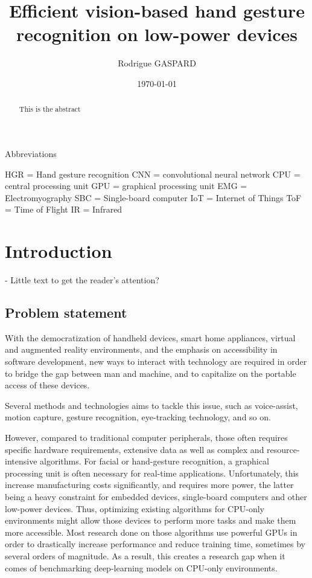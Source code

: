 \documentclass[12pt]{article}
\title{Efficient vision-based hand gesture recognition on low-power devices}
\author{Rodrigue GASPARD}
\date{\today}
\begin{document}
  \maketitle

  Abbreviations

  HGR = Hand gesture recognition
  CNN = convolutional neural network
  CPU = central processing unit
  GPU = graphical processing unit
  EMG = Electromyography
  SBC = Single-board computer
  IoT = Internet of Things
  ToF = Time of Flight
  IR = Infrared

  \begin{abstract}
    This is the abstract
  \end{abstract}

  \section{Introduction}

  - Little text to get the reader's attention?

  \subsection{Problem statement}

  With the democratization of handheld devices, smart home appliances,  virtual and augmented reality environments, and the emphasis on accessibility in software development, new ways to interact with technology are required in order to bridge the gap between man and machine, and to capitalize on the portable access of these devices. 

  Several methods and technologies aims to tackle this issue, such as voice-assist, motion capture, gesture recognition, eye-tracking technology, and so on. 

  However, compared to traditional computer peripherals, those often requires specific hardware requirements, extensive data as well as complex and resource-intensive algorithms. For facial or hand-gesture recognition, a graphical processing unit is often necessary for real-time applications. Unfortunately, this increase manufacturing costs significantly, and requires more power, the latter being a heavy constraint for embedded devices, single-board computers and other low-power devices.
  Thus, optimizing existing algorithms for CPU-only environments might allow those devices to perform more tasks and make them more accessible. Most research done on those algorithms use powerful GPUs in order to drastically increase performance and reduce training time, sometimes by several orders of magnitude. As a result, this creates a research gap when it comes of benchmarking deep-learning models on CPU-only environments.
\end{document}
